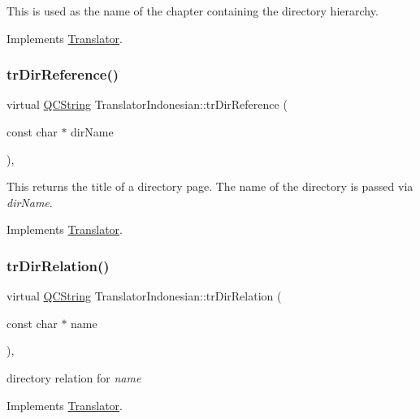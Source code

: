 This is used as the name of the chapter containing the directory hierarchy. 

Implements \mbox{\hyperlink{class_translator}{Translator}}.

\mbox{\label{class_translator_indonesian_a416032adff144a9abdd5945feaee488f}} 
\subsubsection{\texorpdfstring{trDirReference()}{trDirReference()}}
{\footnotesize\ttfamily virtual \mbox{\hyperlink{class_q_c_string}{Q\+C\+String}} Translator\+Indonesian\+::tr\+Dir\+Reference (\begin{DoxyParamCaption}\item[{const char $\ast$}]{dir\+Name }\end{DoxyParamCaption})\hspace{0.3cm}{\ttfamily [inline]}, {\ttfamily [virtual]}}

This returns the title of a directory page. The name of the directory is passed via {\itshape dir\+Name}. 

Implements \mbox{\hyperlink{class_translator}{Translator}}.

\mbox{\label{class_translator_indonesian_a8baf2426a61102617e219d230a895e78}} 
\subsubsection{\texorpdfstring{trDirRelation()}{trDirRelation()}}
{\footnotesize\ttfamily virtual \mbox{\hyperlink{class_q_c_string}{Q\+C\+String}} Translator\+Indonesian\+::tr\+Dir\+Relation (\begin{DoxyParamCaption}\item[{const char $\ast$}]{name }\end{DoxyParamCaption})\hspace{0.3cm}{\ttfamily [inline]}, {\ttfamily [virtual]}}

directory relation for {\itshape name} 

Implements \mbox{\hyperlink{class_translator}{Translator}}.

